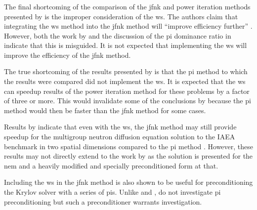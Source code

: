     \subsubsection{\texorpdfstring{}{Wielandt Shift}}
    \label{sec:wielandt_shift}
      The final shortcoming of the comparison of the \gls{jfnk} and power
      iteration methods presented by \citeauthor{qe2paper} is the improper
      consideration of the \gls{ws}. The authors claim that integrating the
      \gls{ws} method into the \gls{jfnk} method will ``improve efficiency
      further'' \cite{qe2paper}. However, both the work by
      \citeauthor{gill_azmy} and the discussion of the \gls{pi} dominance ratio
      in  indicate that this is misguided. It is not
      expected that implementing the \gls{ws} will improve the efficiency of the
      \gls{jfnk} method.

      The true shortcoming of the results presented by \citeauthor{qe2paper} is
      that the \gls{pi} method to which the results were compared did not
      implement the \gls{ws}. It is expected that the \gls{ws} can speedup
      results of the power iteration method for these problems by a factor of
      three or more. This would invalidate some of the conclusions by
      \citeauthor{qe2paper} because the \gls{pi} method would then be faster
      than the \gls{jfnk} method for some cases.

      Results by \citeauthor{jfnk_wielandt} indicate that even with the
      \gls{ws}, the \gls{jfnk} method may still provide speedup for the
      multigroup neutron diffusion equation solution to the IAEA benchmark in
      two spatial dimensions compared to the \gls{pi} method
      \cite{jfnk_wielandt}. However, these results may not directly extend to
      the work by \citeauthor{qe2paper} as the solution is presented for the
      \gls{nem} and a heavily modified and specially preconditioned form at
      that.

      Including the \gls{ws} in the \gls{jfnk} method is also shown to be useful
      for preconditioning the Krylov solver with a series of \glspl{pi}. Unlike
      \citeauthor{gill_azmy} and \citeauthor{jfnk_wielandt},
      \citeauthor{qe2paper} do not investigate \gls{pi} preconditioning but
      such a preconditioner warrants investigation.
